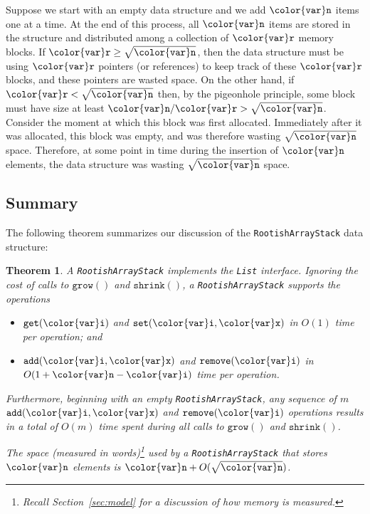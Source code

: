 \documentclass[10pt]{book}
\newcommand{\secref}[1]{Section~\ref{sec:#1}}
\theoremstyle{plain}
\newtheorem{thm}{Theorem}[chapter]
\newcommand{\thmlabel}[1]{\label{thm:#1}}
\theoremstyle{definition}
\begin{document}
Suppose we start with an empty data structure and we add \ensuremath{\mathtt{{\color{var}n}}} items one
at a time.  At the end of this process, all \ensuremath{\mathtt{{\color{var}n}}} items are stored in
the structure and distributed among a collection of \ensuremath{\mathtt{{\color{var}r}}} memory blocks.
If $\ensuremath{\mathtt{{\color{var}r}}}\ge \sqrt{\ensuremath{\mathtt{{\color{var}n}}}}$, then the data structure must be using \ensuremath{\mathtt{{\color{var}r}}}
pointers (or references) to keep track of these \ensuremath{\mathtt{{\color{var}r}}} blocks, and these
pointers are wasted space.  On the other hand, if $\ensuremath{\mathtt{{\color{var}r}}} < \sqrt{\ensuremath{\mathtt{{\color{var}n}}}}$
then, by the pigeonhole principle, some block must have size at
least $\ensuremath{\mathtt{{\color{var}n}}}/\ensuremath{\mathtt{{\color{var}r}}} > \sqrt{\ensuremath{\mathtt{{\color{var}n}}}}$.  Consider the moment at which this block
was first allocated.  Immediately after it was allocated, this block
was empty, and was therefore wasting $\sqrt{\ensuremath{\mathtt{{\color{var}n}}}}$ space.  Therefore,
at some point in time during the insertion of \ensuremath{\mathtt{{\color{var}n}}} elements, the data
structure was wasting $\sqrt{\ensuremath{\mathtt{{\color{var}n}}}}$ space.

\subsection{Summary}

The following theorem summarizes our discussion of the \texttt{RootishArrayStack}
data structure:

\begin{thm}\thmlabel{rootisharraystack}
  A \texttt{RootishArrayStack} implements the \texttt{List} interface.  Ignoring the cost of
  calls to \ensuremath{\mathtt{grow()}} and \ensuremath{\mathtt{shrink()}}, a \texttt{RootishArrayStack} supports the operations
  \begin{itemize}
    \item \ensuremath{\mathtt{get({\color{var}i})}} and \ensuremath{\mathtt{set({\color{var}i},{\color{var}x})}} in $O(1)$ time per operation; and
    \item \ensuremath{\mathtt{add({\color{var}i},{\color{var}x})}} and \ensuremath{\mathtt{remove({\color{var}i})}} in $O(1+\ensuremath{\mathtt{{\color{var}n}}}-\ensuremath{\mathtt{{\color{var}i}}})$ time per operation.
  \end{itemize}
  Furthermore, beginning with an empty \texttt{RootishArrayStack}, any sequence of $m$
  \ensuremath{\mathtt{add({\color{var}i},{\color{var}x})}} and \ensuremath{\mathtt{remove({\color{var}i})}} operations results in a total of $O(m)$
  time spent during all calls to \ensuremath{\mathtt{grow()}} and \ensuremath{\mathtt{shrink()}}.

  The space (measured in words)\footnote{Recall \secref{model} for a
  discussion of how memory is measured.} used by a \texttt{RootishArrayStack}
  that stores \ensuremath{\mathtt{{\color{var}n}}} elements is $\ensuremath{\mathtt{{\color{var}n}}} +O(\sqrt{\ensuremath{\mathtt{{\color{var}n}}}})$.
\end{thm}
\end{document}
